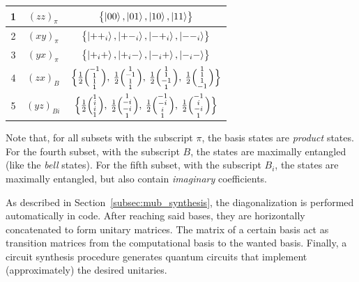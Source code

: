 \documentclass[a4paper,12pt]{article}
\newcommand{\qvect}[4]{%
  \ensuremath{\Bigl(\negthinspace\begin{smallmatrix}#1\\#2\\#3\\#4\end{smallmatrix}\Bigr)}}
\begin{document}
\begin{table}[h]
    \centering
    \begin{tabular}{|c|c|c|}
        \hline
        1 & $(zz)_\pi$  & $\bigl\{ \ket{00}, \ket{01}, \ket{10}, \ket{11}\bigr\}$ \\ \hline
        2 & $(xy)_\pi$  & $\bigl\{ \ket{++_i}, \ket{+-_i}, \ket{-+_i}, \ket{--_i}\bigr\}$ \\ \hline
        3 & $(yx)_\pi$  & $\bigl\{ \ket{+_i+}, \ket{+_i-}, \ket{-_i+}, \ket{-_i-}\bigr\}$ \\ \hline
        4 & $(zx)_B$    & $\Bigl\{ \frac{1}{2}\qvect{-1}{1}{1}{1},\: \frac{1}{2}\qvect{1}{-1}{1}{1},\: \frac{1}{2}\qvect{1}{1}{-1}{1},\: \frac{1}{2}\qvect{1}{1}{1}{-1}\Bigr\}$ \\ \hline
        5 & $(yz)_{Bi}$ & $\Bigl\{ \frac{1}{2}\qvect{1}{i}{i}{1},\: \frac{1}{2}\qvect{1}{-i}{-i}{1},\: \frac{1}{2}\qvect{-1}{-i}{i}{1},\: \frac{1}{2}\qvect{-1}{i}{-i}{1}\Bigr\}$ \\ \hline
    \end{tabular}
\end{table}

Note that, for all subsets with the subscript $\pi$, the basis states are \emph{product} states.
For the fourth subset, with the subscript $B$, the states are maximally entangled (like the \emph{bell} states).
For the fifth subset, with the subscript $B_i$, the states are maximally entangled, but also contain \emph{imaginary} coefficients.

As described in Section~\ref{subsec:mub_synthesis}, the diagonalization is performed automatically in code.
After reaching said bases, they are horizontally concatenated to form unitary matrices.
The matrix of a certain basis act as transition matrices from the computational basis to the wanted basis.
Finally, a circuit synthesis procedure generates quantum circuits that implement (approximately) the desired unitaries.
\end{document}
